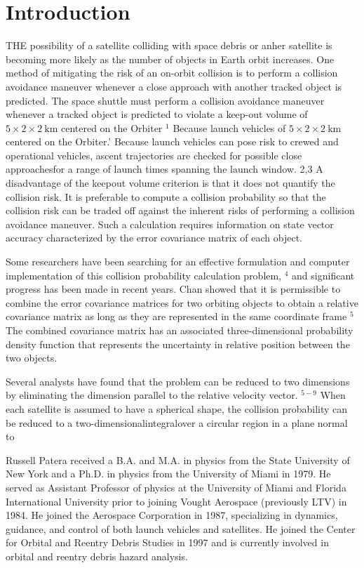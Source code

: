 \documentclass[10pt]{article}
\begin{document}
\section{Introduction}
THE possibility of a satellite colliding with space debris or anher satellite is becoming more likely as the number of objects in Earth orbit increases. One method of mitigating the risk of an on-orbit collision is to perform a collision avoidance maneuver whenever a close approach with another tracked object is predicted. The space shuttle must perform a collision avoidance maneuver whenever a tracked object is predicted to violate a keep-out volume of $5 \times 2 \times 2 \mathrm{~km}$ centered on the Orbiter ${ }^{1}$ Because launch vehicles of $5 \times 2 \times 2 \mathrm{~km}$ centered on the Orbiter.' Because launch vehicles can pose risk to crewed and operational vehicles, ascent trajectories are checked for possible close approachesfor a range of launch times spanning the launch window. 2,3 A disadvantage of the keepout volume criterion is that it does not quantify the collision risk. It is preferable to compute a collision probability so that the collision risk can be traded off against the inherent risks of performing a collision avoidance maneuver. Such a calculation requires information on state vector accuracy characterized by the error covariance matrix of each object.

Some researchers have been searching for an effective formulation and computer implementation of this collision probability calculation problem, ${ }^{4}$ and significant progress has been made in recent years. Chan showed that it is permissible to combine the error covariance matrices for two orbiting objects to obtain a relative covariance matrix as long as they are represented in the same coordinate frame ${ }^{5}$ The combined covariance matrix has an associated three-dimensional probability density function that represents the uncertainty in relative position between the two objects.

Several analysts have found that the problem can be reduced to two dimensions by eliminating the dimension parallel to the relative velocity vector. ${ }^{5-9}$ When each satellite is assumed to have a spherical shape, the collision probability can be reduced to a two-dimensionalintegralover a circular region in a plane normal to

Russell Patera received a B.A. and M.A. in physics from the State University of New York and a Ph.D. in physics from the University of Miami in 1979. He served as Assistant Professor of physics at the University of Miami and Florida International University prior to joining Vought Aerospace (previously LTV) in 1984. He joined the Aerospace Corporation in 1987, specializing in dynamics, guidance, and control of both launch vehicles and satellites. He joined the Center for Orbital and Reentry Debris Studies in 1997 and is currently involved in orbital and reentry debris hazard analysis.
\end{document}
